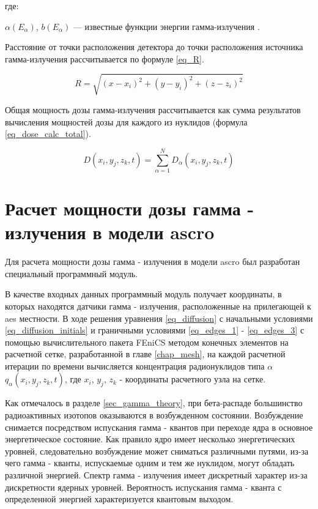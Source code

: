где:
\begin{description}
    \item $\alpha(E_{\alpha})$, $b (E_{\alpha}) $ --- известные функции энергии гамма-излучения \cite{mashkovich}.
\end{description}

Расстояние от точки расположения детектора до точки расположения источника гамма-излучения рассчитывается по формуле
\ref{eq_R}.

\begin{equation}
    \label{eq_R}
    R = \sqrt{(x - x_i)^2 + (y - y_i)^2 + (z - z_i)^2}
\end{equation}

Общая мощность дозы гамма-излучения рассчитывается как сумма результатов вычисления мощностей дозы для каждого из
нуклидов (формула \ref{eq_dose_calc_total}).

\begin{equation}
    \label{eq_dose_calc_total}
    D(x_i, y_j, z_k, t) = \sum_{\alpha = 1}^{N} D_{\alpha} (x_i, y_j, z_k, t)
\end{equation}

\section{Расчет мощности дозы гамма - излучения в модели \ac{ascro}}

Для расчета мощности дозы гамма - излучения в модели \ac{ascro} был разработан специальный программный модуль.

В качестве входных данных программный модуль получает координаты, в которых находятся датчики гамма - излучения, 
расположенные на прилегающей к \ac{aes} местности. В ходе решения уравнения \ref{eq_diffusion} с начальными условиями 
\ref{eq_diffusion_initials} и граничными условиями \ref{eq_edges_1} - \ref{eq_edges_3} с помощью вычислительного 
пакета FEniCS методом конечных элементов на расчетной сетке, разработанной в главе \ref{chap_mesh}, на каждой расчетной 
итерации по времени вычисляется концентрация радионуклидов типа $\alpha$ $q_{\alpha}(x_i, y_j, z_k, t)$, где $x_i$, $y_j$, 
$z_k$ - координаты расчетного узла на сетке. 

Как отмечалось в разделе \ref{sec_gamma_theory}, при бета-распаде большинство радиоактивных изотопов оказываются в 
возбужденном состоянии. Возбуждение снимается посредством испускания гамма - квантов при переходе ядра в основное 
энергетическое состояние. Как правило ядро имеет несколько энергетических уровней, следовательно возбуждение может 
сниматься различными путями, из-за чего гамма - кванты, испускаемые одним и тем же нуклидом, могут обладать различной 
энергией. Спектр гамма - излучения имеет дискретный характер из-за дискретности ядерных уровней. Вероятность испускания 
гамма - кванта с определенной энергией характеризуется квантовым выходом.

